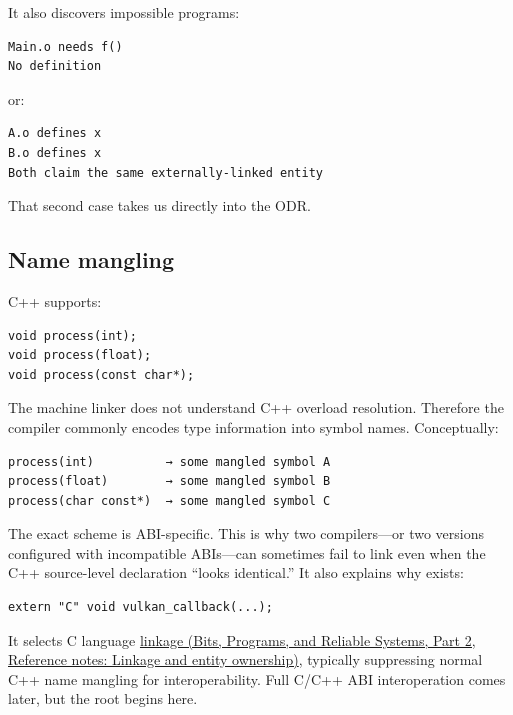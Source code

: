 It also discovers impossible programs:

\begin{verbatim}
Main.o needs f()
No definition
\end{verbatim}

or:

\begin{verbatim}
A.o defines x
B.o defines x
Both claim the same externally-linked entity
\end{verbatim}

That second case takes us directly into the ODR.

\subsection{Name mangling}\label{05-engine-i-ch002-name-mangling}

\hypertarget{05-engine-i-ch002-name-mangling}{}

C++ supports:

\begin{verbatim}
void process(int);
void process(float);
void process(const char*);
\end{verbatim}

The machine linker does not understand C++ overload resolution. Therefore the compiler commonly encodes type information into symbol names. Conceptually:

\begin{verbatim}
process(int)          → some mangled symbol A
process(float)        → some mangled symbol B
process(char const*)  → some mangled symbol C
\end{verbatim}

The exact scheme is ABI-specific. This is why two compilers---or two versions configured with incompatible ABIs---can sometimes fail to link even when the C++ source-level declaration ``looks identical.'' It also explains why  exists:

\begin{verbatim}
extern "C" void vulkan_callback(...);
\end{verbatim}

It selects C language \href{../01-Bits-Programs-and-Reliable-Systems-P02/main.pdf\#appendix-74a0ec818c18}{linkage (Bits, Programs, and Reliable Systems, Part 2, Reference notes: Linkage and entity ownership)}, typically suppressing normal C++ name mangling for interoperability. Full C/C++ ABI interoperation comes later, but the root begins here.

